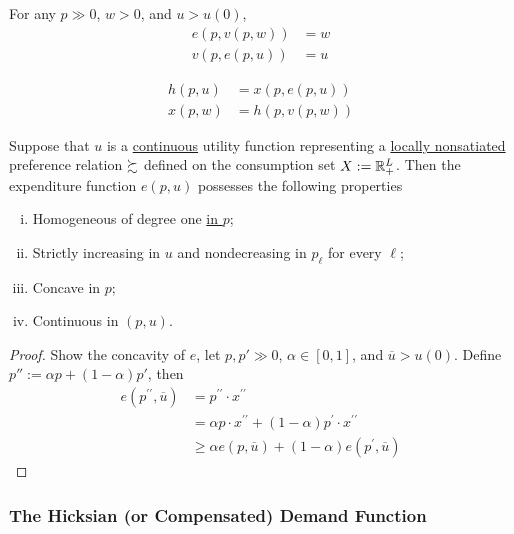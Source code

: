 \documentclass{article}
\begin{document}
 			\begin{corollary}
 				For any $p \gg 0$, $w > 0$, and $u > u(0)$,
 				\begin{align}
 					e(p, v(p, w)) &= w \\
 					v(p, e(p, u)) &= u 
 				\end{align}
 			\end{corollary}
 			
 			\begin{corollary}
 				\begin{align}
 					h(p, u) &= x(p, e(p, u)) \\
 					x(p, w) &= h(p, v(p, w))
 				\end{align}
 			\end{corollary}
 			
 			\begin{proposition}[3.E.2]
 				Suppose that $u$ is a \ul{continuous} utility function representing a \ul{locally nonsatiated} preference relation $\succsim$ defined on the consumption set $X := \mathbb{R}^L_+$. Then the expenditure function $e(p, u)$ possesses the following properties
 				\begin{enumerate}[(i)]
 					\item Homogeneous of degree one \ul{in $p$};
 					\item Strictly increasing in $u$ and nondecreasing in $p_\ell$ for every $\ell$;
 					\item Concave in $p$;
 					\item Continuous in $(p, u)$.
 				\end{enumerate}
 			\end{proposition}
 			
 			\begin{proof}
 				Show the concavity of $e$, let $p, p' \gg 0$, $\alpha \in [0, 1]$, and $\overline{u} > u(0)$. Define $p'' := \alpha p + (1-\alpha)p'$, then
 				\begin{align} 
 					e\left(p^{\prime \prime}, \overline{u}\right) &=p^{\prime \prime} \cdot x^{\prime \prime} \\
 					&=\alpha p \cdot x^{\prime \prime}+(1-\alpha) p^{\prime} \cdot x^{\prime \prime} \\ 
 					& \geq \alpha e(p, \overline{u})+(1-\alpha) e\left(p^{\prime}, \overline{u}\right) 
 				\end{align}
 			\end{proof}
 			
 			\subsubsection{The Hicksian (or Compensated) Demand Function}
 			
\end{document}
